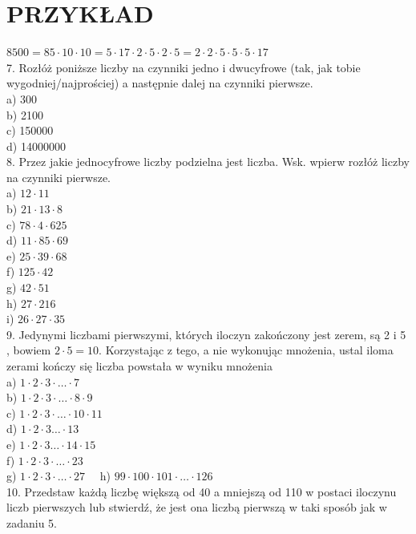 \documentclass[10pt]{article}
\begin{document}
\section*{PRZYKŁAD}
\(8500=85 \cdot 10 \cdot 10=5 \cdot 17 \cdot 2 \cdot 5 \cdot 2 \cdot 5=2 \cdot 2 \cdot 5 \cdot 5 \cdot 5 \cdot 17\)\\
7. Rozłóż poniższe liczby na czynniki jedno i dwucyfrowe (tak, jak tobie wygodniej/najprościej) a następnie dalej na czynniki pierwsze.\\
a) 300\\
b) 2100\\
c) 150000\\
d) 14000000\\
8. Przez jakie jednocyfrowe liczby podzielna jest liczba. Wsk. wpierw rozłóż liczby na czynniki pierwsze.\\
a) \(12 \cdot 11\)\\
b) \(21 \cdot 13 \cdot 8\)\\
c) \(78 \cdot 4 \cdot 625\)\\
d) \(11 \cdot 85 \cdot 69\)\\
e) \(25 \cdot 39 \cdot 68\)\\
f) \(125 \cdot 42\)\\
g) \(42 \cdot 51\)\\
h) \(27 \cdot 216\)\\
i) \(26 \cdot 27 \cdot 35\)\\
9. Jedynymi liczbami pierwszymi, których iloczyn zakończony jest zerem, są 2 i 5 , bowiem \(2 \cdot 5=10\). Korzystając z tego, a nie wykonując mnożenia, ustal iloma zerami kończy się liczba powstała w wyniku mnożenia\\
a) \(1 \cdot 2 \cdot 3 \cdot \ldots \cdot 7\)\\
b) \(1 \cdot 2 \cdot 3 \cdot \ldots \cdot 8 \cdot 9\)\\
c) \(1 \cdot 2 \cdot 3 \cdot \ldots \cdot 10 \cdot 11\)\\
d) \(1 \cdot 2 \cdot 3 \ldots \cdot 13\)\\
e) \(1 \cdot 2 \cdot 3 \ldots \cdot 14 \cdot 15\)\\
f) \(1 \cdot 2 \cdot 3 \cdot \ldots \cdot 23\)\\
g) \(1 \cdot 2 \cdot 3 \cdot \ldots \cdot 27 \quad\) h) \(99 \cdot 100 \cdot 101 \cdot \ldots \cdot 126\)\\
10. Przedstaw każdą liczbę większą od 40 a mniejszą od 110 w postaci iloczynu liczb pierwszych lub stwierdź, że jest ona liczbą pierwszą w taki sposób jak w zadaniu 5.\\
\end{document}
